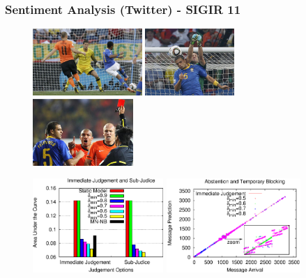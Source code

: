 \documentclass{beamer}
\begin{document}
\begin{frame}\frametitle{Sentiment Analysis (Twitter) - SIGIR 11}

\vspace{-0.1in}
\begin{figure}
\centering
\includegraphics[height=1.00in]{golrobinho.eps}
\includegraphics[height=1.00in]{contra.eps}
\includegraphics[height=1.00in]{vermelho.eps}
\end{figure}

\vspace{-0.15in}
\begin{figure}
\centering
\includegraphics[height=1.40in]{fmarea.eps}
\includegraphics[height=1.40in]{fmmom.eps}
\end{figure}


\end{frame}
\end{document}
